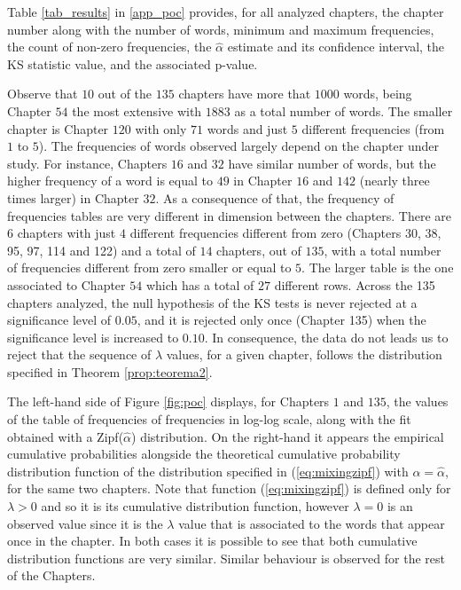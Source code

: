 \documentclass{article}
\begin{document}
Table \ref{tab_results} in \ref{app_poc} provides, for all analyzed chapters, the chapter number along with the number of words, minimum and maximum frequencies, the count of non-zero frequencies, the $\hat{\alpha}$ estimate and its confidence interval, the KS statistic value, and the associated p-value.

Observe that $10$ out of the $135$ chapters have more that $1000$ words, being Chapter $54$ the most extensive with $1883$ as a total number of words. The smaller chapter is Chapter $120$ with only $71$ words and just $5$ different frequencies (from $1$ to $5$). The frequencies of words observed largely depend on the chapter under study. For instance, Chapters $16$ and $32$ have similar number of words, but the higher frequency of a word is equal to $49$ in Chapter $16$ and $142$ (nearly three times larger) in Chapter $32$. As a consequence of that, the frequency of frequencies tables are very different in dimension between the chapters. There are $6$ chapters with just $4$ different frequencies different from zero (Chapters 30, 38, 95, 97, 114 and 122) and a total of $14$ chapters, out of $135$, with a total number of frequencies different from zero smaller or equal to $5$. The larger table is the one associated to Chapter $54$ which has a total of $27$ different rows. Across the 135 chapters analyzed, the null hypothesis of the  KS tests is never rejected at a significance level of $0.05$, and it is rejected only once (Chapter 135) when the significance level is increased to $0.10$. In consequence, the data do not leads us to reject that the sequence of $\lambda$ values, for a given chapter, follows the distribution specified in Theorem \ref{prop:teorema2}.

The left-hand side of Figure \ref{fig:poc} displays, for Chapters $1$ and $135$, the values of the table of frequencies of frequencies in log-log scale, along with the fit obtained with a Zipf($\hat{\alpha}$) distribution. On the right-hand it appears the empirical cumulative probabilities alongside the theoretical cumulative probability distribution function of the distribution specified in (\ref{eq:mixingzipf}) with $\alpha=\hat \alpha$, for the same two chapters. Note that function (\ref{eq:mixingzipf})  is defined only for $\lambda >0$ and so it is its cumulative distribution function, however  $\lambda=0$ is an observed value since it is the $\lambda$ value that is associated to the words that appear once in the chapter. In both cases it is possible to see that both cumulative distribution functions are very similar. Similar behaviour is observed for the rest of the Chapters.
\end{document}

